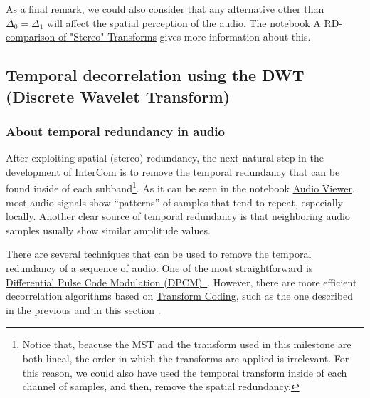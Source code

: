 As a final remark, we could also consider that any alternative other than $\Delta_0=\Delta_1$ will affect the spatial perception of the audio. The notebook \href{https://github.com/Tecnologias-multimedia/Tecnologias-multimedia.github.io/blob/master/contents/transform_coding/stereo_transforms_RD.ipynb}{A
  RD-comparison of "Stereo" Transforms} gives more information about this.



\subsection{Temporal decorrelation using the DWT (Discrete Wavelet Transform)}

\subsubsection{About temporal redundancy in audio}

After exploiting spatial (stereo) redundancy, the next natural
step in the development of InterCom is to remove the temporal
redundancy that can be found inside of each subband\footnote{Notice
that, beacuse the MST and the transform used in this milestone are
both lineal, the order in which the transforms are applied is
irrelevant. For this reason, we could also have used the temporal
transform inside of each channel of samples, and then, remove the
spatial redundancy.}. As it can be seen in the notebook
\href{https://github.com/Tecnologias-multimedia/intercom/blob/master/tools/audio_viewer.ipynb}{Audio Viewer},
most audio signals show ``patterns'' of samples that tend to repeat,
especially locally. Another clear source of temporal redundancy is
that neighboring audio samples usually show similar amplitude values.

There are several techniques that can be used to remove the
temporal redundancy of a sequence of audio. One of the most
straightforward is
\href{https://en.wikipedia.org/wiki/Differential_pulse-code_modulation}{Differential
  Pulse Code Modulation
  (DPCM)~\cite{sayood2017introduction}}. However, there are more
efficient decorrelation algorithms based on
\href{https://en.wikipedia.org/wiki/Transform_coding}{Transform
  Coding}, such as the one described in the previous and in this
section .

